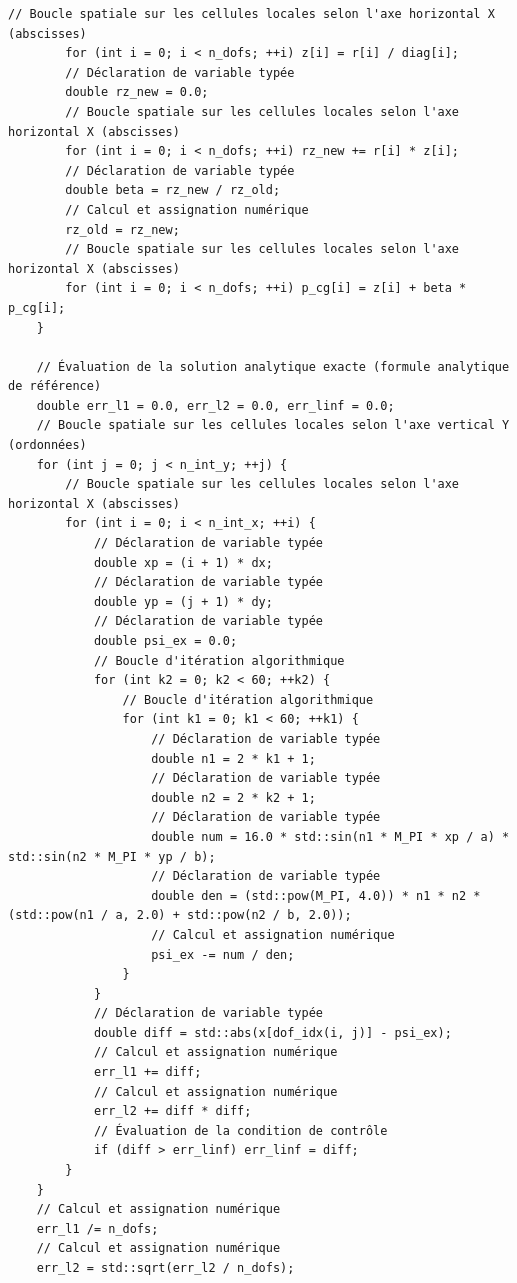 \documentclass[10pt,a4paper,oneside]{book}
\begin{document}
\begin{lstlisting}[language={[11]C++}]
        // Boucle spatiale sur les cellules locales selon l'axe horizontal X (abscisses)
        for (int i = 0; i < n_dofs; ++i) z[i] = r[i] / diag[i];
        // Déclaration de variable typée
        double rz_new = 0.0;
        // Boucle spatiale sur les cellules locales selon l'axe horizontal X (abscisses)
        for (int i = 0; i < n_dofs; ++i) rz_new += r[i] * z[i];
        // Déclaration de variable typée
        double beta = rz_new / rz_old;
        // Calcul et assignation numérique
        rz_old = rz_new;
        // Boucle spatiale sur les cellules locales selon l'axe horizontal X (abscisses)
        for (int i = 0; i < n_dofs; ++i) p_cg[i] = z[i] + beta * p_cg[i];
    }

    // Évaluation de la solution analytique exacte (formule analytique de référence)
    double err_l1 = 0.0, err_l2 = 0.0, err_linf = 0.0;
    // Boucle spatiale sur les cellules locales selon l'axe vertical Y (ordonnées)
    for (int j = 0; j < n_int_y; ++j) {
        // Boucle spatiale sur les cellules locales selon l'axe horizontal X (abscisses)
        for (int i = 0; i < n_int_x; ++i) {
            // Déclaration de variable typée
            double xp = (i + 1) * dx;
            // Déclaration de variable typée
            double yp = (j + 1) * dy;
            // Déclaration de variable typée
            double psi_ex = 0.0;
            // Boucle d'itération algorithmique
            for (int k2 = 0; k2 < 60; ++k2) {
                // Boucle d'itération algorithmique
                for (int k1 = 0; k1 < 60; ++k1) {
                    // Déclaration de variable typée
                    double n1 = 2 * k1 + 1;
                    // Déclaration de variable typée
                    double n2 = 2 * k2 + 1;
                    // Déclaration de variable typée
                    double num = 16.0 * std::sin(n1 * M_PI * xp / a) * std::sin(n2 * M_PI * yp / b);
                    // Déclaration de variable typée
                    double den = (std::pow(M_PI, 4.0)) * n1 * n2 * (std::pow(n1 / a, 2.0) + std::pow(n2 / b, 2.0));
                    // Calcul et assignation numérique
                    psi_ex -= num / den;
                }
            }
            // Déclaration de variable typée
            double diff = std::abs(x[dof_idx(i, j)] - psi_ex);
            // Calcul et assignation numérique
            err_l1 += diff;
            // Calcul et assignation numérique
            err_l2 += diff * diff;
            // Évaluation de la condition de contrôle
            if (diff > err_linf) err_linf = diff;
        }
    }
    // Calcul et assignation numérique
    err_l1 /= n_dofs;
    // Calcul et assignation numérique
    err_l2 = std::sqrt(err_l2 / n_dofs);


\end{lstlisting}
\end{document}
